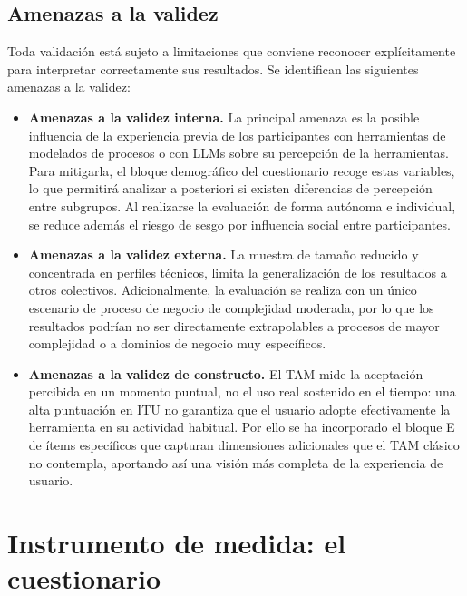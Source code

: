 \subsection{Amenazas a la validez}
Toda validación está sujeto a limitaciones que conviene reconocer explícitamente para interpretar correctamente sus resultados. Se identifican las siguientes amenazas a la validez: 

\begin{itemize}
    \item \textbf{Amenazas a la validez interna.} La principal amenaza es la posible influencia de la experiencia previa de los participantes con herramientas de modelados de procesos o con LLMs sobre su percepción de la herramientas. Para mitigarla, el bloque demográfico del cuestionario recoge estas variables, lo que permitirá analizar a posteriori si existen diferencias de percepción entre subgrupos. Al realizarse la evaluación de forma autónoma e individual, se reduce además el riesgo de sesgo por influencia social entre participantes.

    \item \textbf{Amenazas a la validez externa.} La muestra de tamaño reducido y concentrada en perfiles técnicos, limita la generalización de los resultados a otros colectivos. Adicionalmente, la evaluación se realiza con un único escenario de proceso de negocio de complejidad moderada, por lo que los resultados podrían no ser directamente extrapolables a procesos de mayor complejidad o a dominios de negocio muy específicos.

    \item \textbf{Amenazas a la validez de constructo.} El TAM mide la aceptación percibida en un momento puntual, no el uso real sostenido en el tiempo: una alta puntuación en ITU no garantiza que el usuario adopte efectivamente la herramienta en su actividad habitual. Por ello se ha incorporado el bloque E de ítems específicos que capturan dimensiones adicionales que el TAM clásico no contempla, aportando así una visión más completa de la experiencia de usuario.
\end{itemize}


\section{Instrumento de medida: el cuestionario}
\label{sec:cuestionario}

